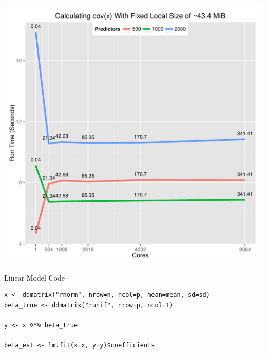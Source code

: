 \begin{frame}
  \begin{block}{}
  \begin{center}
    \includegraphics[height=.88\textheight]{pics/cov}
  \end{center}
  \end{block}
\end{frame}




\begin{frame}[fragile]
  \begin{block}{Linear Model Code}
\begin{lstlisting}
x <- ddmatrix("rnorm", nrow=n, ncol=p, mean=mean, sd=sd)
beta_true <- ddmatrix("runif", nrow=p, ncol=1)

y <- x %*% beta_true

beta_est <- lm.fit(x=x, y=y)$coefficients
\end{lstlisting}
  \end{block}
\end{frame}

